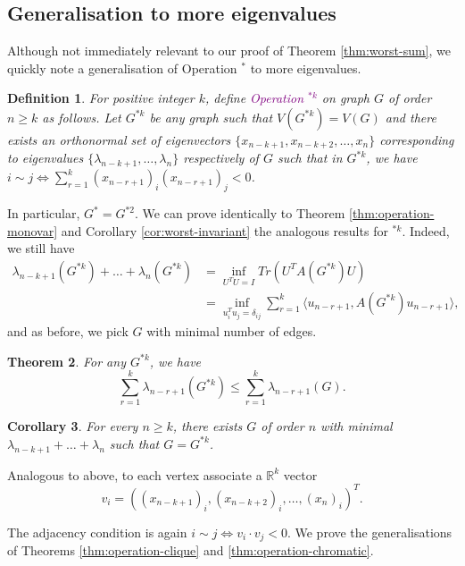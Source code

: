 \documentclass[11pt]{article}
\newcommand{\purp}[1]{\textcolor{purple}{#1}}
\newtheorem{thm}{Theorem}[section]
\newtheorem{dfn}[thm]{Definition}
\newtheorem{cor}[thm]{Corollary}
\begin{document}
\subsection{Generalisation to more eigenvalues}\label{sub:generalisation}

Although not immediately relevant to our proof of Theorem \ref{thm:worst-sum}, we quickly note a generalisation of Operation $^*$ to more eigenvalues. 

\begin{dfn}\label{dfn:generalised-operation}
    For positive integer $k$, define \purp{Operation $^{*k}$} on graph $G$ of order $n \ge k$ as follows. Let $G^{*k}$ be any graph such that $V(G^{*k}) = V(G)$ and there exists an orthonormal set of eigenvectors $\{x_{n-k+1}, x_{n-k+2}, \dots, x_n\}$ corresponding to eigenvalues $\{\lambda_{n-k+1}, \dots, \lambda_n\}$ respectively of $G$ such that in $G^{*k}$, we have $i \sim j \iff \sum_{r = 1}^k (x_{n-r+1})_i(x_{n-r+1})_j < 0$. 
\end{dfn}

In particular, $G^* = G^{*2}$. We can prove identically to Theorem \ref{thm:operation-monovar} and Corollary \ref{cor:worst-invariant} the analogous results for $^{*k}$. Indeed, we still have
\begin{align*}
    \lambda_{n-k+1}(G^{*k}) + \dots + \lambda_n(G^{*k}) &= \inf_{U^TU = I} Tr(U^TA(G^{*k})U) \\
    &= \inf_{u_i^Tu_j = \delta_{ij}} \sum_{r = 1}^k \langle u_{n-r+1}, A(G^{*k}) u_{n-r+1} \rangle,
\end{align*}
and as before, we pick $G$ with minimal number of edges.

\begin{thm}\label{thm:generalised-operation-monovar}
    For any $G^{*k}$, we have
    \[\sum_{r = 1}^k \lambda_{n-r+1}(G^{*k}) \le \sum_{r = 1}^k \lambda_{n-r+1}(G).\]
\end{thm}

\begin{cor}\label{cor:generalised-worst-invariant}
    For every $n \ge k$, there exists $G$ of order $n$ with minimal $\lambda_{n-k+1} + \dots + \lambda_n$ such that $G = G^{*k}$.
\end{cor}

Analogous to above, to each vertex associate a $\mathbb{R}^k$ vector
\[v_i = ((x_{n-k+1})_i, (x_{n-k+2})_i, \dots, (x_n)_i)^T.\]

The adjacency condition is again $i \sim j \iff v_i \cdot v_j < 0$. We prove the generalisations of Theorems \ref{thm:operation-clique} and \ref{thm:operation-chromatic}. 
\end{document}
